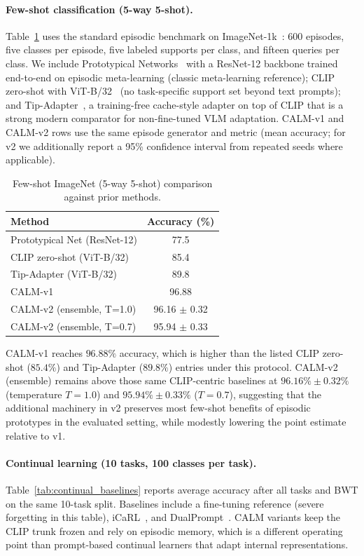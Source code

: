 \documentclass{article}
\begin{document}
\paragraph{Few-shot classification (5-way 5-shot).}
Table~\ref{tab:fewshot_baselines} uses the standard episodic benchmark on ImageNet-1k~\citep{deng2009imagenet}: 600 episodes, five classes per episode, five labeled supports per class, and fifteen queries per class. We include Prototypical Networks~\citep{snell2017proto} with a ResNet-12 backbone trained end-to-end on episodic meta-learning (classic meta-learning reference); CLIP zero-shot with ViT-B/32~\citep{radford2021clip} (no task-specific support set beyond text prompts); and Tip-Adapter~\citep{zhang2022tipadapter}, a training-free cache-style adapter on top of CLIP that is a strong modern comparator for non-fine-tuned VLM adaptation. CALM-v1 and CALM-v2 rows use the same episode generator and metric (mean accuracy; for v2 we additionally report a 95\% confidence interval from repeated seeds where applicable).

\begin{table}[t]
\caption{Few-shot ImageNet (5-way 5-shot) comparison against prior methods.}
\label{tab:fewshot_baselines}
  \centering
\begin{tabular}{lc}
    \toprule
Method & Accuracy (\%) \\
\midrule
Prototypical Net (ResNet-12) & 77.5 \\
CLIP zero-shot (ViT-B/32) & 85.4 \\
Tip-Adapter (ViT-B/32) & 89.8 \\
    \midrule
CALM-v1 & 96.88 \\
CALM-v2 (ensemble, T=1.0) & 96.16 $\pm$ 0.32 \\
CALM-v2 (ensemble, T=0.7) & 95.94 $\pm$ 0.33 \\
    \bottomrule
  \end{tabular}
\end{table}

CALM-v1 reaches $96.88\%$ accuracy, which is higher than the listed CLIP zero-shot ($85.4\%$) and Tip-Adapter ($89.8\%$) entries under this protocol. CALM-v2 (ensemble) remains above those same CLIP-centric baselines at $96.16\% \pm 0.32\%$ (temperature $T=1.0$) and $95.94\% \pm 0.33\%$ ($T=0.7$), suggesting that the additional machinery in v2 preserves most few-shot benefits of episodic prototypes in the evaluated setting, while modestly lowering the point estimate relative to v1.

\paragraph{Continual learning (10 tasks, 100 classes per task).}
Table~\ref{tab:continual_baselines} reports average accuracy after all tasks and BWT on the same 10-task split. Baselines include a fine-tuning reference (severe forgetting in this table), iCaRL~\citep{rebuffi2017icarl}, and DualPrompt~\citep{wang2022dualprompt}. CALM variants keep the CLIP trunk frozen and rely on episodic memory, which is a different operating point than prompt-based continual learners that adapt internal representations.
\end{document}
